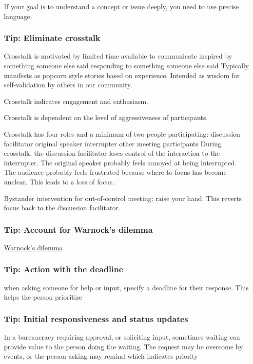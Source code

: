 If your goal is to understand a concept or issue deeply, you need to use precise language.


\subsubsection{Tip: Eliminate crosstalk}

Crosstalk is motivated by
limited time available to communicate
inspired by something someone else said
responding to something someone else said
Typically manifests as popcorn style stories based on experience. Intended as wisdom for self-validation by others in our community. 

Crosstalk indicates engagement and enthusiasm. 

Crosstalk is dependent on the level of aggressiveness of participants.

Crosstalk has four roles and a minimum of two people participating:
discussion facilitator
original speaker
interrupter
other meeting participants
During crosstalk, the discussion facilitator loses control of the interaction to the interrupter. The original speaker probably feels annoyed at being interrupted. The audience probably feels frustrated because where to focus has become unclear. This leads to a loss of focus. 

Bystander intervention for out-of-control meeting: raise your hand. This reverts focus back to the discussion facilitator. 

\subsubsection{Tip: Account for Warnock's dilemma}
\href{https://en.wikipedia.org/wiki/Warnock\%27s_dilemma}{Warnock's dilemma}

\subsubsection{Tip: Action with the deadline}

when asking someone for help or input, specify a deadline for their response. This helps the person prioritize


\subsubsection{Tip: Initial responsiveness and status updates}
In a bureaucracy requiring approval, or soliciting input, sometimes waiting can provide value to the person doing the waiting. The request may be overcome by events, or the person asking may remind which indicates priority

